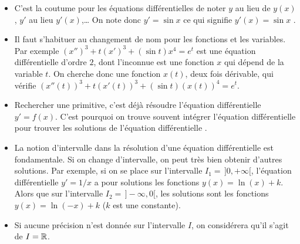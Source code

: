 \documentclass[class=report,crop=false]{standalone}
\begin{document}
\begin{remarque*}
\sauteligne
\begin{itemize}
  \item C'est la coutume pour les équations différentielles de noter $y$ au lieu de $y(x)$,
  $y'$ au lieu $y'(x)$,\ldots
  On note donc \og $y' = \sin x$ \fg{} ce qui signifie \og $y'(x) = \sin x$ \fg.

  \item Il faut s'habituer au changement de nom pour les fonctions et les variables.
  Par exemple $(x'')^3+t(x')^3+(\sin t) x^4=e^t$
  est une équation différentielle d'ordre $2$, dont l'inconnue est
  une fonction $x$ qui dépend de la variable $t$. On cherche donc une fonction $x(t)$,
  deux fois dérivable, qui vérifie $(x''(t))^3+t(x'(t))^3+(\sin t) (x(t))^4=e^t$.

  \item Rechercher une primitive, c'est déjà résoudre l'équation différentielle
  $y'= f(x)$. C'est pourquoi on trouve souvent \og intégrer l'équation différentielle \fg{} 
  pour \og trouver les solutions de l'équation différentielle \fg.


  \item La notion d'intervalle dans la résolution d'une équation différentielle est fondamentale.
  Si on change d'intervalle, on peut très bien obtenir d'autres solutions.
  Par exemple, si on se place sur l'intervalle $I_1 =\,]0, +\infty[$,
  l'équation différentielle $y' = 1/x$ a pour solutions les fonctions $y(x) = \ln(x) + k$.
Alors que sur l'intervalle $I_2 =\,]-\infty, 0[$, les solutions sont les fonctions $y(x) = \ln(-x) + k$
($k$ est une constante).

  \item Si aucune précision n'est donnée sur l'intervalle $I$,
  on considérera qu'il s'agit de $I = \mathbb{R}$.
\end{itemize}
\end{remarque*}
\end{document}
